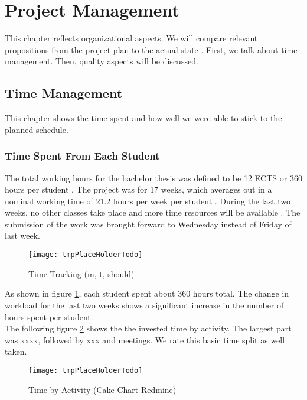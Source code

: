 \section{Project Management}
\label{section:project_management}
This chapter reflects organizational aspects.
We will compare relevant propositions from the project plan to the actual state \cite{projectplan}.
First, we talk about time management. Then, quality aspects will be discussed.

\subsection{Time Management}
This chapter shows the time spent and how well we were able to stick to the planned schedule.

\subsubsection{Time Spent From Each Student}
The total working hours for the bachelor thesis was defined to be 12 ECTS or 360 hours per student \cite{projectplan}.
The project was for 17 weeks, which averages out in a nominal working time of 21.2 hours per week per student \cite{projectplan}.
During the last two weeks, no other classes take place and more time resources will be available \cite{projectplan}.
The submission of the work was brought forward to Wednesday instead of Friday of last week.

\begin{figure}[H]
    \centering
    \texttt{[image: tmpPlaceHolderTodo]}
    \caption{Time Tracking (m, t, should)}
    \label{fig:timetracking}
\end{figure}

As shown in figure \ref{fig:timetracking}, each student spent about 360 hours total.
The change in workload for the last two weeks shows a significant increase in the number of hours spent per student. \\

The following figure \ref{fig:timetracking_activity} shows the the invested time by activity.
The largest part was xxxx, followed by xxx and meetings.
We rate this basic time split as well taken.

\begin{figure}[H]
    \centering
    \texttt{[image: tmpPlaceHolderTodo]}
    \caption{Time by Activity (Cake Chart Redmine)}
    \label{fig:timetracking_activity}
\end{figure}

